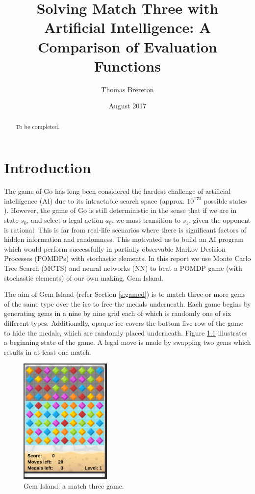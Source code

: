 \documentclass{bhamthesis}
\title{Solving Match Three with Artificial Intelligence: A Comparison of Evaluation Functions}
\author{Thomas Brereton}
\date{August 2017}  %
\makeatletter
\theoremstyle{definition}
\newcommand{\makecrestcover}{%
\begin{titlepage}
\centering\singlespacing
\vspace*{1cm}
{\huge\bfseries University of Birmingham\par}
\vspace*{2cm}
\texttt{[image: crest]}\par
\vspace*{\stretch{1}}
{\Huge\bfseries
\@author\par
\vspace{1cm}
\@title\par}
\vspace*{\stretch{1}}
{\Large\@date\par}
\end{titlepage}
}
\makeatother
\begin{document}
\frontmatter

\maketitle


\begin{abstract}
To be completed.
\end{abstract}

\tableofcontents
\mainmatter

\chapter{Introduction}
The game of Go has long been considered the hardest challenge of artificial intelligence (AI) due to its intractable search space (approx. $10^{170}$ possible states \cite{Gelly2012}). However, the game of Go is still deterministic in the sense that if we are in state $s_0$, and select a legal action $a_0$, we must transition to $s_1$, given the opponent is rational. This is far from real-life scenarios where there is significant factors of hidden information and randomness. This motivated us to build an AI program which would perform successfully in partially observable Markov Decision Processes (POMDPs) with stochastic elements. In this report we use Monte Carlo Tree Search (MCTS) and neural networks (NN) to beat a POMDP game (with stochastic elements) of our own making, Gem Island. 

The aim of Gem Island (refer Section \ref{s:gamed}) is to match three or more gems of the same type over the ice to free the medals underneath. Each game begins by generating gems in a nine by nine grid each of which is randomly one of six different types. Additionally, opaque ice covers the bottom five row of the game to hide the medals, which are randomly placed underneath. Figure \ref{f:gemIsland} illustrates a beginning state of the game. A legal move is made by swapping two gems which results in at least one match.

\begin{figure}[h]
	\centering
	\includegraphics[width=0.4\textwidth]{media/img/screen2}
	\caption{Gem Island: a match three game.}\label{f:gemIsland}
\end{figure}
\end{document}
